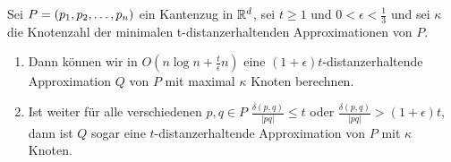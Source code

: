     \begin{theorem}
    	\label{theo:mvpstime}
    	Sei $P = (p_1, p_2, \mathellipsis, p_n)$ ein Kantenzug in $\mathbb{R}^d$, sei $t \geq 1$ und $0 < \epsilon < \frac{1}{3}$ und sei $\kappa$ die Knotenzahl der minimalen t-distanzerhaltenden Approximationen von $P$.
    	\begin{enumerate}
    		\item Dann können wir in $O(n \log n + \frac{t}{\epsilon}n)$ eine $(1 + \epsilon)t$-distanzerhaltende Approximation $Q$ von $P$ mit maximal $\kappa$ Knoten berechnen.
    		\item Ist weiter für alle verschiedenen $p, q \in P$ $\frac{\delta(p,q)}{|pq|} \leq t$ oder $\frac{\delta(p,q)}{|pq|} > (1 + \epsilon)t$, dann ist $Q$ sogar eine $t$-distanzerhaltende Approximation von $P$ mit $\kappa$ Knoten.
    	\end{enumerate}
    	
    \end{theorem}